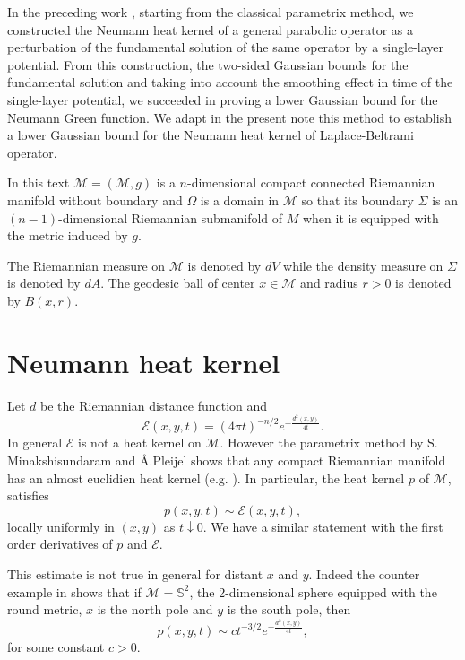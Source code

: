 \documentclass{birkjour}
\begin{document}
\smallskip
In the preceding work \cite{CK}, starting from the classical  parametrix method, we constructed the Neumann heat kernel of a general parabolic operator as a perturbation of the fundamental solution of the same operator by a single-layer potential. From this construction, the two-sided Gaussian bounds for the fundamental solution and taking into account the smoothing effect in time of the single-layer potential, we succeeded in proving a lower Gaussian bound for the Neumann Green function. We adapt in the present note this method  to establish a lower Gaussian bound for the Neumann heat kernel of Laplace-Beltrami operator.

\smallskip
In this text $\mathcal{M}=(\mathcal{M},g)$ is a $n$-dimensional compact connected Riemannian manifold without boundary and $\Omega$ is a  domain in $\mathcal{M}$ so that its boundary $\Sigma$ is an $(n-1)$-dimensional Riemannian submanifold of $M$ when it is equipped with the metric induced by $g$.

\smallskip
The Riemannian measure on $\mathcal{M}$ is denoted by $dV$ while the density measure on $\Sigma$ is denoted by $dA$. The geodesic ball of center $x\in \mathcal{M}$ and radius $r>0$ is denoted by $B(x,r)$.


\section{Neumann heat kernel}

\smallskip
Let $d$ be the Riemannian distance function and
\[
\mathscr{E}(x,y,t)=(4\pi t)^{-n/2}e^{-\frac{d^2(x,y)}{4t}}.
\]
In general $\mathscr{E}$ is not a heat kernel on $\mathcal{M}$. However the parametrix method by S. Minakshisundaram and \AA.Pleijel shows that any compact Riemannian manifold has an almost euclidien heat kernel (e.g. \cite{BGM, Cha}). In particular, the heat kernel $p$ of $\mathcal{M}$, satisfies 
\[
p(x,y,t)\sim \mathscr{E}(x,y,t),
\]
locally uniformly in $(x,y)$ as $t\downarrow 0$. We have a similar statement with the first order derivatives of $p$ and $\mathscr{E}$.

\smallskip
This estimate is not true in general for distant $x$ and $y$. Indeed the counter example in \cite[Example 3.1, page 23]{Mo} shows that if $\mathscr{M}=\mathbb{S}^2$, the 2-dimensional sphere equipped with the round metric, $x$ is the north pole and $y$ is the south pole, then
\[
p(x,y,t)\sim ct^{-3/2}e^{-\frac{d^2(x,y)}{4t}},
\]
for some constant $c>0$.
\end{document}
